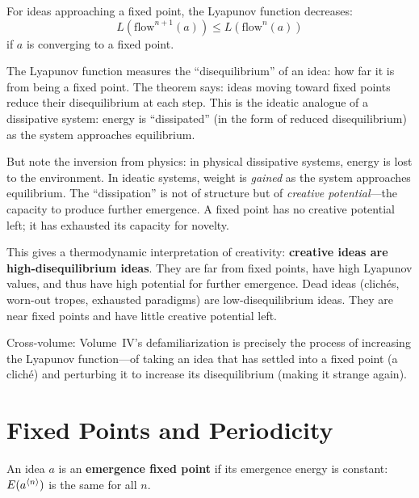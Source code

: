\begin{theorem}
\label{thm:lyapunov-decrease}
For ideas approaching a fixed point, the Lyapunov function decreases:
\[
  L(\text{flow}^{n+1}(a)) \leq L(\text{flow}^n(a))
\]
if $a$ is converging to a fixed point.
\end{theorem}

\begin{interpretation}
The Lyapunov function measures the ``disequilibrium'' of an idea: how far it
is from being a fixed point. The theorem says: ideas moving toward fixed
points reduce their disequilibrium at each step. This is the ideatic analogue
of a dissipative system: energy is ``dissipated'' (in the form of reduced
disequilibrium) as the system approaches equilibrium.

But note the inversion from physics: in physical dissipative systems, energy
is lost to the environment. In ideatic systems, weight is \emph{gained} as the
system approaches equilibrium. The ``dissipation'' is not of structure but of
\emph{creative potential}---the capacity to produce further emergence. A
fixed point has no creative potential left; it has exhausted its capacity for
novelty.

This gives a thermodynamic interpretation of creativity: \textbf{creative
ideas are high-disequilibrium ideas}. They are far from fixed points, have
high Lyapunov values, and thus have high potential for further emergence. Dead
ideas (clichés, worn-out tropes, exhausted paradigms) are low-disequilibrium
ideas. They are near fixed points and have little creative potential left.

Cross-volume: Volume~IV's defamiliarization is precisely the process of
increasing the Lyapunov function---of taking an idea that has settled into a
fixed point (a cliché) and perturbing it to increase its disequilibrium
(making it strange again).
\end{interpretation}


\section{Fixed Points and Periodicity}

\begin{definition}
\label{def:fixed-point}
An idea $a$ is an \textbf{emergence fixed point} if its emergence energy is
constant: $E(a^{\langle n \rangle})$ is the same for all $n$.
\end{definition}

